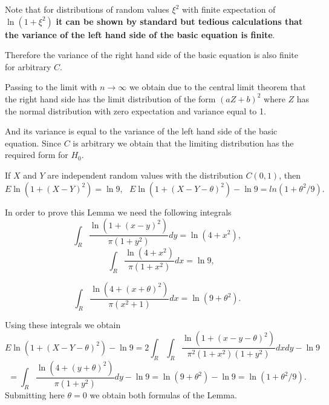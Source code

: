 \documentclass[slidestop,usepdftitle=false]{beamer}
\begin{document}
 \begin{slide}
 \bigskip
\bigskip


 Note  that for distributions of random values $ \xi^2$  with finite expectation of $\ln (1+ \xi^2)$ {\bf it can be shown by standard but tedious calculations that the variance of the left hand side of the basic equation is finite}.

\bigskip
\bigskip

 Therefore the variance of the right hand side of the basic equation is also finite for arbitrary $C$.
\end{slide}
\begin{slide}
\bigskip
\bigskip

Passing to the limit with $n\to \infty$ we obtain due to the central limit theorem that the right hand side has the limit distribution of the form $(aZ+b)^2$ where  $Z$ has the normal distribution with zero expectation and variance equal to 1.

\bigskip
\bigskip

And its variance  is equal to the variance of the left hand side  of the basic equation. Since $C$ is arbitrary we obtain that the limiting distribution has the required form for $H_0$.
 \end{slide}
\begin{slide}

\begin{lemma}If $X$ and $Y$ are independent random values with the distribution
$C(0,1)$, then
\begin{equation*}
 E \ln(1+ (X- Y)^2)= \ln 9,\,\,\,\,
 E \ln(1+ (X- Y - \theta)^2)-\ln 9
 =
ln(1+ \theta^2/9).
\end{equation*}
\end{lemma}
In order to prove this Lemma we need the following integrals
\begin{equation*}
\int_{R}
\frac {\ln(1+(x-y)^2)}{\pi(1+y^2)} dy = \ln(4+x^2),
\end{equation*}
\begin{equation*}
\quad \int_{R} \frac {\ln(4+x^2)}{\pi(1+x^2)} dx = \ln 9,
\end{equation*}

\end{slide}
\begin{slide}
\begin{equation*}
\int_{R} \frac{\ln(4 +(x +\theta)^2 )}{\pi(x^2 +1)} dx = \ln(9+\theta^2).
\end{equation*}

\bigskip

Using these integrals we obtain
\begin{equation*}
 E \ln(1+ (X- Y - \theta)^2)-\ln 9  = 2\int_{R} \int_{R} \frac{\ln(1+(x-y-\theta)^2)}{\pi^2(1+x^2)(1+y^2)} dx dy -\ln 9
\end{equation*}
\begin{equation*}
= \int_{R}\frac{\ln(4 +(y+\theta)^2)}{\pi(1+y^2)} dy- \ln 9= \ln(9+\theta^2) -\ln 9 = \ln(1+ \theta^2/9).
\end{equation*}
Submitting here  $\theta=0$ we obtain both formulas of the Lemma.

\end{slide}
\end{document}
